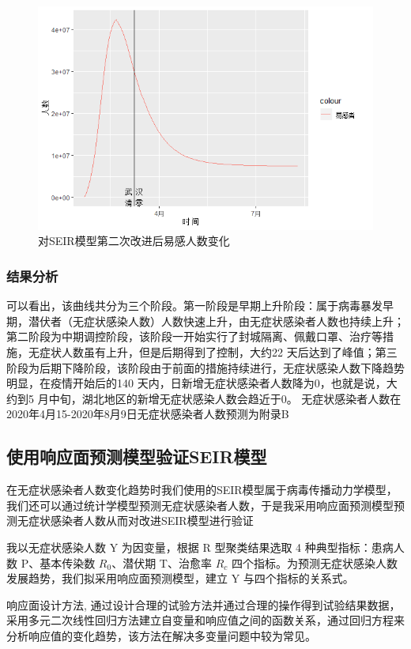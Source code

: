 \documentclass[a4paper, 11pt,twoside=true,UTF8]{scrartcl}
\begin{document}
\begin{figure}[H]
	\small
	\centering
	\includegraphics[width=12.5cm]{P3F9}
	\caption{对SEIR模型第二次改进后易感人数变化} \label{P3F9}
\end{figure}

\subsubsection{结果分析}
可以看出，该曲线共分为三个阶段。第一阶段是早期上升阶段：属于病毒暴发早期，潜伏者（无症状感染人数）人数快速上升，由无症状感染者人数也持续上升；第二阶段为中期调控阶段，该阶段一开始实行了封城隔离、佩戴口罩、治疗等措施，无症状人数虽有上升，但是后期得到了控制，大约22 天后达到了峰值；第三阶段为后期下降阶段，该阶段由于前面的措施持续进行，无症状感染人数下降趋势明显，在疫情开始后的140 天内，日新增无症状感染者人数降为0，也就是说，大约到5 月中旬，湖北地区的新增无症状感染人数会趋近于0。
无症状感染者人数在2020年4月15-2020年8月9日无症状感染者人数预测为附录B

\subsection{使用响应面预测模型验证SEIR模型}
在无症状感染者人数变化趋势时我们使用的SEIR模型属于病毒传播动力学模型，我们还可以通过统计学模型预测无症状感染者人数，于是我采用响应面预测模型预测无症状感染者人数从而对改进SEIR模型进行验证

我以无症状感染人数 Y 为因变量，根据 R 型聚类结果选取 4 种典型指标：患病人数 P、基本传染数 $R_0$、潜伏期 T、治愈率 $R_c$ 四个指标。为预测无症状感染人数发展趋势，我们拟采用响应面预测模型，建立 Y 与四个指标的关系式。 

响应面设计方法, 通过设计合理的试验方法并通过合理的操作得到试验结果数据，采用多元二次线性回归方法建立自变量和响应值之间的函数关系，通过回归方程来分析响应值的变化趋势，该方法在解决多变量问题中较为常见。 
\end{document}
